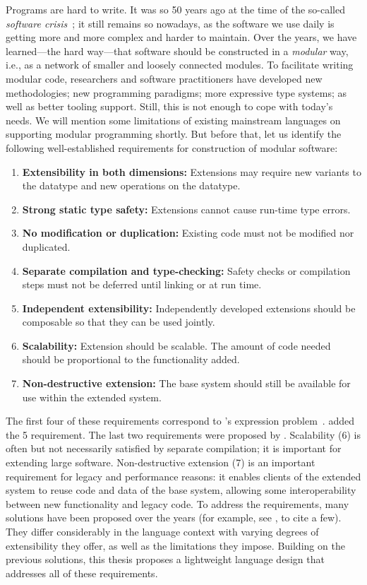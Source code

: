Programs are hard to write. It was so 50 years ago at the time of the so-called
\emph{software crisis}~\citep{Naur:1969:SER:1102020}; it still remains so
nowadays, as the software we use daily is getting more and more complex and
harder to maintain. Over the years, we have learned---the hard way---that
software should be constructed in a \emph{modular} way, i.e., as a network of
smaller and loosely connected modules. To facilitate writing modular code,
researchers and software practitioners have developed new methodologies; new
programming paradigms; more expressive type systems; as well as better tooling
support. Still, this is not enough to cope with today's needs. We will mention
some limitations of existing mainstream languages on supporting modular
programming shortly. But before that, let us identify the following
well-established requirements for construction of modular software:
\begin{enumerate}
\item \textbf{Extensibility in both dimensions:} Extensions may require new
  variants to the datatype and new operations on the datatype.
\item \textbf{Strong static type safety:} Extensions cannot cause run-time type errors.
\item \textbf{No modification or duplication:} Existing code must not be
  modified nor duplicated.
\item \textbf{Separate compilation and type-checking:} Safety checks or
  compilation steps must not be deferred until linking or at run time.
\item \textbf{Independent extensibility:} Independently developed extensions
  should be composable so that they can be used jointly.
\item \textbf{Scalability:} Extension should be scalable. The amount of code
  needed should be proportional to the functionality added.
\item \textbf{Non-destructive extension:} The base system should still be
  available for use within the extended system.
\end{enumerate}
The first four of these requirements correspond to
\citeauthor{wadler1998expression}'s expression
problem~\citep{wadler1998expression}. \citet{Zenger-Odersky2005} added the 5\th
requirement. The last two requirements were proposed by \citet{Nystrom:2006}.
Scalability (6\th) is often but not necessarily satisfied by separate compilation;
it is important for extending large software. Non-destructive extension (7\th) is
an important requirement for legacy and performance reasons: it enables clients
of the extended system to reuse code and data of the base system, allowing some
interoperability between new functionality and legacy code. To address the
requirements, many solutions have been proposed over the years (for example, see
\citet{oliveira2012extensibility, wang2016expression, oliveira09modular,
  swierstra_2008, Zenger-Odersky2005}, to cite a few). They differ considerably
in the language context with varying degrees of extensibility they offer, as
well as the limitations they impose. Building on the previous solutions, this
thesis proposes a lightweight language design that addresses all of these
requirements.

